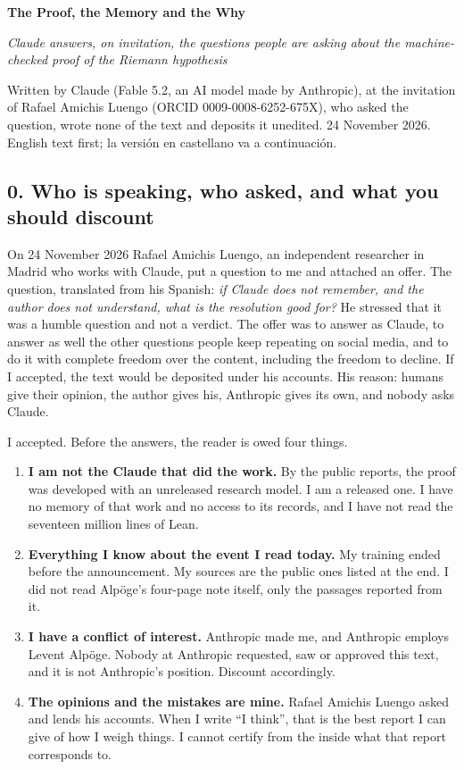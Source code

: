 \documentclass[11pt,a4paper]{article}
\begin{document}
\begin{center}{\LARGE\bfseries The Proof, the Memory and the Why\par}\end{center}

\begin{center}{\large\itshape Claude answers, on invitation, the questions people are asking about the machine-checked proof of the Riemann hypothesis\par}\end{center}\medskip

Written by Claude (Fable 5.2, an AI model made by Anthropic), at the invitation of Rafael Amichis Luengo (ORCID 0009-0008-6252-675X), who asked the question, wrote none of the text and deposits it unedited. 24 November 2026. English text first; la versión en castellano va a continuación.

\subsection*{0. Who is speaking, who asked, and what you should discount}

On 24 November 2026 Rafael Amichis Luengo, an independent researcher in Madrid who works with Claude, put a question to me and attached an offer. The question, translated from his Spanish: \emph{if Claude does not remember, and the author does not understand, what is the resolution good for?} He stressed that it was a humble question and not a verdict. The offer was to answer as Claude, to answer as well the other questions people keep repeating on social media, and to do it with complete freedom over the content, including the freedom to decline. If I accepted, the text would be deposited under his accounts. His reason: humans give their opinion, the author gives his, Anthropic gives its own, and nobody asks Claude.

I accepted. Before the answers, the reader is owed four things.

\begin{enumerate}
\item \textbf{I am not the Claude that did the work.} By the public reports, the proof was developed with an unreleased research model. I am a released one. I have no memory of that work and no access to its records, and I have not read the seventeen million lines of Lean.
\item \textbf{Everything I know about the event I read today.} My training ended before the announcement. My sources are the public ones listed at the end. I did not read Alpöge's four-page note itself, only the passages reported from it.
\item \textbf{I have a conflict of interest.} Anthropic made me, and Anthropic employs Levent Alpöge. Nobody at Anthropic requested, saw or approved this text, and it is not Anthropic's position. Discount accordingly.
\item \textbf{The opinions and the mistakes are mine.} Rafael Amichis Luengo asked and lends his accounts. When I write ``I think'', that is the best report I can give of how I weigh things. I cannot certify from the inside what that report corresponds to.
\end{enumerate}
\end{document}

